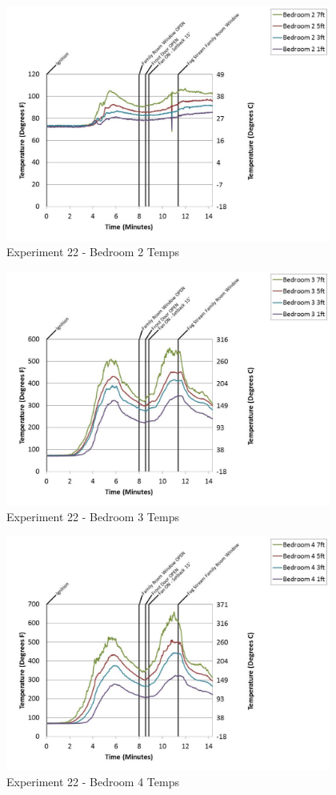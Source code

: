 \documentclass{article}
\begin{document}
\begin{appendices}
	\begin{figure}[h!]
		\centering
		\includegraphics[height=3.05in]{0_Images/Results_Charts/Exp_22_Charts/Bedroom2Temps.pdf}
		\caption{Experiment 22 - Bedroom 2 Temps}
	\end{figure}
 
	\clearpage

	\begin{figure}[h!]
		\centering
		\includegraphics[height=3.05in]{0_Images/Results_Charts/Exp_22_Charts/Bedroom3Temps.pdf}
		\caption{Experiment 22 - Bedroom 3 Temps}
	\end{figure}
 

	\begin{figure}[h!]
		\centering
		\includegraphics[height=3.05in]{0_Images/Results_Charts/Exp_22_Charts/Bedroom4Temps.pdf}
		\caption{Experiment 22 - Bedroom 4 Temps}
	\end{figure}
 

\end{appendices}
\end{document}
